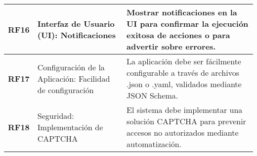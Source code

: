 \begin{longtable}{|l|p{5cm}|p{8.5cm}|}
    \textbf{RF16}  & Interfaz de Usuario (UI): Notificaciones                                        & Mostrar notificaciones en la UI para confirmar la ejecución exitosa de acciones o para advertir sobre errores.             \\ \hline
    \textbf{RF17}  & Configuración de la Aplicación: Facilidad de configuración                      & La aplicación debe ser fácilmente configurable a través de archivos .json o .yaml, validados mediante JSON Schema.         \\ \hline
    \textbf{RF18}  & Seguridad: Implementación de CAPTCHA                                            & El sistema debe implementar una solución CAPTCHA para prevenir accesos no autorizados mediante automatización.            \\ \hline
\end{longtable}

